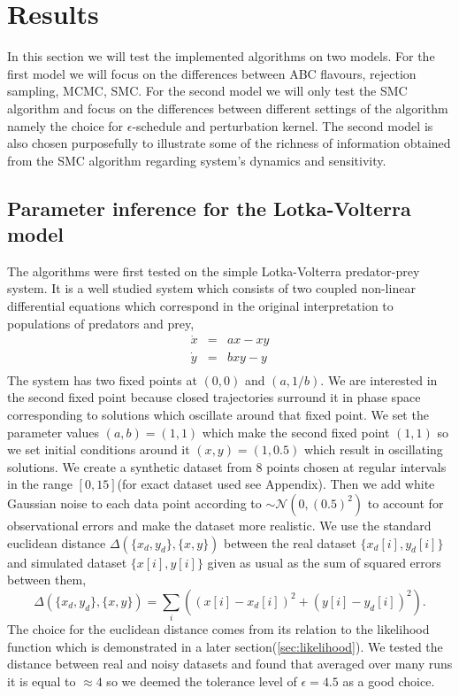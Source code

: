 \section{Results}
In this section we will test the implemented algorithms on two models. For the first model we will focus on the differences between ABC flavours, rejection sampling, MCMC, SMC. For the second model we will only test the SMC algorithm and focus on the differences between different settings of the algorithm namely the choice for $\epsilon$-schedule and perturbation kernel. The second model is also chosen purposefully to illustrate some of the richness of information obtained from the SMC algorithm regarding system's dynamics and sensitivity.

\subsection{Parameter inference for the Lotka-Volterra model}
The algorithms were first tested on the simple Lotka-Volterra predator-prey system\cite[] {lotka1925elements}. It is a well studied system which consists of two coupled non-linear differential equations which correspond in the original interpretation to populations of predators and prey, 
\begin{equation}
\begin{array}{lcl}
\dot x &=& ax - xy \\
\dot y &=& bxy - y \\
\end{array}
\end{equation}
The system has two fixed points at $(0, 0)$ and $(a, 1/b)$. We are interested in the second fixed point because closed trajectories surround it in phase space corresponding to solutions which oscillate around that fixed point. We set the parameter values $(a,b) = (1,1)$ which make the second fixed point $(1, 1)$ so we set initial conditions around it $(x,y) = (1, 0.5)$ which result in oscillating solutions. We create a synthetic dataset from 8 points chosen at regular intervals in the range $[0, 15]$(for exact dataset used see Appendix). Then we add white Gaussian noise to each data point according to $\sim \mathcal{N}(0,(0.5)^2)$ to account for observational errors and make the dataset more realistic. We use the standard euclidean distance $\Delta(\{x_d, y_d\}, \{x, y\})$ between the real dataset $\{x_d[i], y_d[i]\}$ and simulated dataset $\{x[i], y[i]\}$ given as usual as the sum of squared errors between them,
\begin{equation}
\Delta(\{x_d, y_d\}, \{x, y\}) = \sum_{i}\left((x[i] - x_d[i] )^2 + (y[i]-y_d[i])^2\right).
\end{equation}
The choice for the euclidean distance comes from its relation to the likelihood function which is demonstrated in a later section(\ref{sec:likelihood}). We tested the distance between real and noisy datasets and found that averaged over many runs it is equal to $\approx 4$ so we deemed the tolerance level of $\epsilon=4.5$ as a good choice. 

